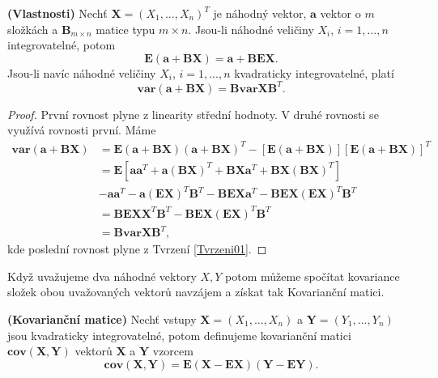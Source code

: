 \begin{proposition}{\textbf{(Vlastnosti)}}
Nechť $\textbf{X} = (X_{1}, ..., X_{n})^{T}$ je náhodný vektor, $\textbf{a}$ vektor o $m$ složkách a $\textbf{B}_{m \times n}$ matice typu $m \times n$. Jsou-li náhodné veličiny $X_{i}$, $i = 1, ..., n$ integrovatelné, potom
\begin{equation}
\mathbf{E}(\textbf{a} + \textbf{B}\textbf{X}) = \textbf{a}+ \textbf{B}\mathbf{E}\textbf{X}.
\end{equation}
Jsou-li navíc náhodné veličiny $X_{i}$, $i = 1, ..., n$ kvadraticky integrovatelné, platí
\begin{equation}
\mathbf{var}(\textbf{a} + \textbf{B}\textbf{X}) = \textbf{B}\mathbf{var}\textbf{X}\textbf{B}^{T}.
\end{equation}
\end{proposition}
\begin{proof}
První rovnost plyne z linearity střední hodnoty. V druhé rovnosti se využívá rovnosti první. Máme
\begin{align*}
\mathbf{var}(\textbf{a} + \textbf{B}\textbf{X}) &= \mathbf{E}(\textbf{a} + \textbf{B}\textbf{X})(\textbf{a} + \textbf{B}\textbf{X})^{T} - [\mathbf{E}(\textbf{a} + \textbf{B}\textbf{X})][\mathbf{E}(\textbf{a} + \textbf{B}\textbf{X})]^{T} \\
&=\mathbf{E}[ \textbf{a}\textbf{a}^{T} + \textbf{a}(\textbf{B}\textbf{X})^{T} + \textbf{B}\textbf{X}\textbf{a}^{T} + \textbf{B}\textbf{X}(\textbf{B}\textbf{X})^{T}] \\
&- \textbf{a}\textbf{a}^{T} - \textbf{a}(\mathbf{E}\textbf{X})^{T} \textbf{B}^{T}- \textbf{B}\mathbf{E}\textbf{X}\textbf{a}^{T} - \textbf{B}\mathbf{E}\textbf{X}(\mathbf{E}\textbf{X})^{T}\textbf{B}^{T} \\
&= \textbf{B}\mathbf{E}\textbf{X}\textbf{X}^{T}\textbf{B}^{T} - \textbf{B}\mathbf{E}\textbf{X}(\mathbf{E}\textbf{X})^{T}\textbf{B}^{T} \\
&= \textbf{B}\mathbf{var}\textbf{X}\textbf{B}^{T},
\end{align*}
kde poslední rovnost plyne z Tvrzení \ref{Tvrzeni01}.
\end{proof}

Když uvažujeme dva náhodné vektory $X, Y$ potom můžeme spočítat kovariance složek obou uvažovaných vektorů navzájem a získat tak Kovarianční matici.
\begin{definition}{\textbf{(Kovarianční matice)}}
Nechť vstupy $\textbf{X} = (X_{1}, ..., X_{n})$ a $\textbf{Y} = (Y_{1}, ..., Y_{n})$ jsou kvadraticky integrovatelné, potom definujeme kovarianční matici $\textbf{cov}(\textbf{X}, \textbf{Y})$ vektorů $\textbf{X}$ a $\textbf{Y}$ vzorcem
\begin{equation}
\mathbf{cov}(\textbf{X}, \textbf{Y}) = \mathbf{E}(\textbf{X}- \mathbf{E}\textbf{X})(\textbf{Y}- \mathbf{E}\textbf{Y}).
\end{equation}
\end{definition}

